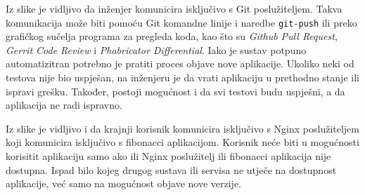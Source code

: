 Iz slike je vidljivo da inženjer komunicira isključivo s Git poslužiteljem. Takva komunikacija može
biti pomoću Git komandne linije i naredbe \texttt{git-push} ili preko grafičkog sučelja programa za
pregleda koda, kao što su \textit{Github Pull Request}, \textit{Gerrit Code Review} i
\textit{Phabricator Differential}. Iako je sustav potpuno automatizitran potrebno je pratiti proces
objave nove aplikacije. Ukoliko neki od testova nije bio uspješan, na inženjeru je da vrati
aplikaciju u prethodno stanje ili ispravi grešku. Također, postoji mogućnost i da svi testovi budu
uspješni, a da aplikacija ne radi ispravno.

Iz slike je vidljivo i da krajnji korisnik komunicira isključivo s Nginx poslužiteljem koji
komunicira isključivo s fibonacci aplikacijom. Korisnik neće biti u mogućnosti korisitit aplikaciju
samo ako ili Nginx poslužitelj ili fibonacci aplikacija nije dostupna. Ispad bilo kojeg drugog
sustava ili servisa ne utječe na dostupnost aplikacije, već samo na mogućnost objave nove verzije.

